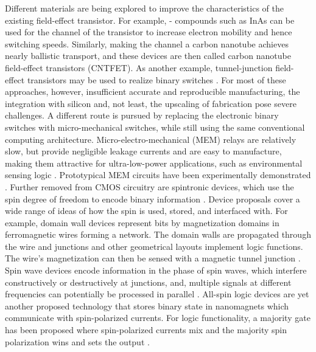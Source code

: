 Different materials are being explored to improve the characteristics of the
existing field-effect transistor. For example, {}-{} compounds such as InAs can be used for the channel of the transistor to
increase electron mobility and hence switching speeds. Similarly, making the
channel a carbon nanotube achieves nearly ballistic transport, and these devices
are then called carbon nanotube field-effect transistors (CNTFET). As another
example, tunnel-junction field-effect transistors may be used to realize binary
switches \cite{nikonov2013overview} \cite{cavin2012science}. For most of these
approaches, however, insufficient accurate and reproducible manufacturing, the
integration with silicon and, not least, the upscaling of fabrication pose
severe challenges. A different route is pursued by replacing the electronic
binary switches with micro-mechanical switches, while still using the same
conventional computing architecture. Micro-electro-mechanical (MEM) relays are
relatively slow, but provide negligible leakage currents and are easy to
manufacture, making them attractive for ultra-low-power applications, such as
environmental sensing logic \cite{kam2011design}. Prototypical MEM circuits have
been experimentally demonstrated \cite{spencer2011demonstration}. Further
removed from CMOS circuitry are spintronic devices, which use the spin degree of
freedom to encode binary information \cite{wolf2001spintronics}. Device
proposals cover a wide range of ideas of how the spin is used, stored, and
interfaced with. For example, domain wall devices represent bits by
magnetization domains in ferromagnetic wires forming a network. The domain walls
are propagated through the wire and junctions and other geometrical layouts
implement logic functions. The wire's magnetization can then be sensed with a
magnetic tunnel junction \cite{allwood2005magnetic}. Spin wave devices encode
information in the phase of spin waves, which interfere constructively or
destructively at junctions, and, multiple signals at different frequencies can
potentially be processed in parallel \cite{khitun2005nano}
\cite{kostylev2005spin}. All-spin logic devices are yet another proposed
technology that stores binary state in nanomagnets which communicate with
spin-polarized currents. For logic functionality, a majority gate has been
proposed where spin-polarized currents mix and the majority spin polarization
wins and sets the output \cite{behin2010proposal} \cite{srinivasan2011all}. 

